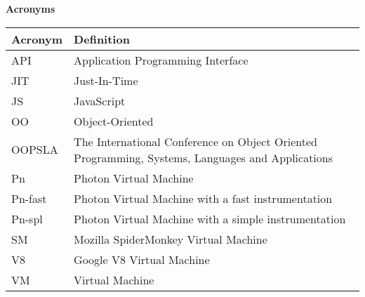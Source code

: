 \begin{center}
\textbf{\large Acronyms}
\end{center}


\vspace{1cm}

\begin{center}
\begin{tabular}{|p{}|p{}|}
  \hline
  Acronym & Definition\\
  \hline \hline
  API & Application Programming Interface\\
  \hline
  JIT & Just-In-Time\\
  \hline
  JS & JavaScript\\
  \hline
  OO & Object-Oriented\\
  \hline
  OOPSLA & The International Conference on Object Oriented Programming, Systems, Languages and Applications \\
  \hline
  Pn & Photon Virtual Machine\\
  \hline
  Pn-fast & Photon Virtual Machine with a fast instrumentation\\
  \hline
  Pn-spl & Photon Virtual Machine with a simple instrumentation\\
  \hline
  SM & Mozilla SpiderMonkey Virtual Machine\\
  \hline
  V8 & Google V8 Virtual Machine\\
  \hline
  VM & Virtual Machine\\
  \hline
\end{tabular}
\end{center}


